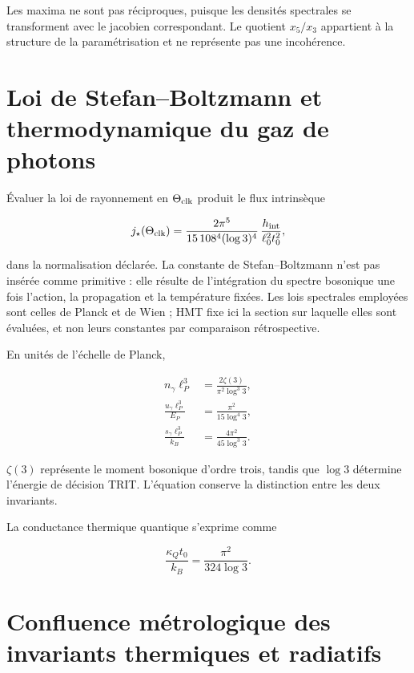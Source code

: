 Les maxima ne sont pas réciproques, puisque les densités spectrales se
transforment avec le jacobien correspondant. Le quotient \(x_5/x_3\)
appartient à la structure de la paramétrisation et ne représente pas une
incohérence.

\section{Loi de Stefan--Boltzmann et thermodynamique du gaz de photons}

Évaluer la loi de rayonnement en \(\Theta_{\rm clk}\) produit le flux intrinsèque

\begin{equation}
j_\star(\Theta_{\rm clk})
=\frac{2\pi^5}{15\,108^4(\log3)^4}\,
\frac{h_{\rm int}}{\ell_0^2t_0^2},
\label{eq:stefan-hmt}
\end{equation}

dans la normalisation déclarée. La constante de Stefan--Boltzmann n'est pas insérée comme primitive : elle résulte de l'intégration du spectre bosonique une fois l'action, la propagation et la température fixées.
Les lois spectrales employées sont celles de Planck et de Wien \cite{Planck,Wien} ; HMT fixe ici la section sur laquelle elles sont évaluées, et non leurs constantes par comparaison rétrospective.

En unités de l'échelle de Planck,

\begin{align}
n_\gamma\ell_P^3
&=\frac{2\zeta(3)}{\pi^2\log^3 3},
\label{eq:photon-number}\\
\frac{u_\gamma\ell_P^3}{E_P}
&=\frac{\pi^2}{15\log^4 3},
\label{eq:photon-energy}\\
\frac{s_\gamma\ell_P^3}{k_B}
&=\frac{4\pi^2}{45\log^3 3}.
\label{eq:photon-entropy}
\end{align}

\(\zeta(3)\) représente le moment bosonique d'ordre trois, tandis que
\(\log3\) détermine l'énergie de décision TRIT. L'équation conserve la
distinction entre les deux invariants.

La conductance thermique quantique s'exprime comme

\begin{equation}
\frac{\kappa_Qt_0}{k_B}=\frac{\pi^2}{324\log3}.
\label{eq:thermal-conductance}
\end{equation}

\section{Confluence métrologique des invariants thermiques et radiatifs}

